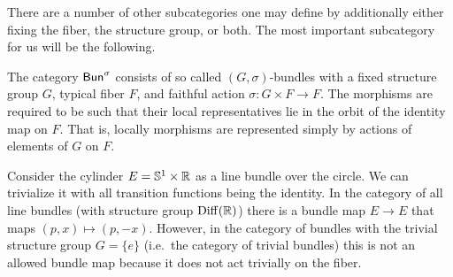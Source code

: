 There are a number of other subcategories one may define by additionally either fixing the fiber, the structure group, or both. The most important subcategory for us will be the following.

\begin{defn}\label{def FB^sigma}
    The category $\mathsf{Bun}^\sigma$ consists of so called $(G,\sigma)$-bundles with a fixed structure group $G$, typical fiber $F$, and faithful action $\sigma:G\times F\to F$. The morphisms are required to be such that their local representatives lie in the orbit of the identity map on $F$. That is, locally morphisms are represented simply by actions of elements of $G$ on $F$.
\end{defn}


\begin{example}
    Consider the cylinder $E=\mathbb{S}^1\times\mathbb{R} $ as a line bundle over the circle. We can trivialize it with all transition functions being the identity. In the category of all line bundles (with structure group $\operatorname{Diff}(\mathbb{R} )$) there is a bundle map $E\to E$ that maps $(p,x)\mapsto (p,-x)$. However, in the category of bundles with the trivial structure group $G=\{e\}$ (i.e.\ the category of trivial bundles) this is not an allowed bundle map because it does not act trivially on the fiber.
\end{example}


